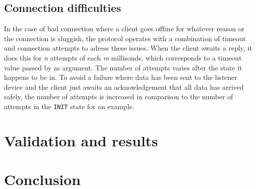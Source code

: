 \documentclass{article}
\newcommand{\code}[1]{\texttt{#1}}
\begin{document}
	\subsection{Connection difficulties}
	
	In the case of bad connection where a client goes offline for whatever reason or the connection is sluggish, the protocol operates with a combination of timeout and connection attempts to adress these issues. When the client awaits a reply, it does this for \textit{n} attempts of each \textit{m} millisonds, which corresponds to a timeout value passed by as argument. The number of attempts varies after the state it happens to be in. To avoid a failure where data has been sent to the listener device and the client just awaits an acknowledgement that all data has arrived safely, the number of attempts is increased in comparison to the number of attempts in the \code{INIT} state for an example.
	
	\section{Validation and results}
	\section{Conclusion}
	
	\pagebreak
	
	
	
	
	
		
\end{document}
